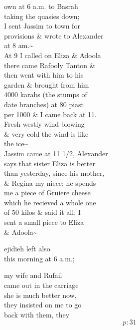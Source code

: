 \documentclass{report}
\begin{document}
	\par{
 	own at 6 a.m. to Basrah\ \\taking the quasies down;\ \\I sent Jassim to town for\ \\provisions \& wrote to Alexander\ \\at 8 am.\~{}\ \\At 9 I called on Eliza \& Adoola\ \\there came Rafooly Tanton \&\ \\then went with him to his\ \\garden \& brought from him\ \\4000 karabs (the stumps of\ \\date branches) at 80 piast\ \\per 1000 \& I came back at 11.\ \\Fresh westly wind blowing\ \\\& very cold the wind is like\ \\the ice\~{}\ \\Jassim came at 11 1/2, Alexander\ \\says that sister Eliza is better\ \\than yesterday, since his mother,\ \\\& Regina my niece; he spends\ \\me a piece of Gruiere cheese\ \\which he recieved a whole one\ \\of 50 kilos \& said it all; I\ \\sent a small piece to Eliza\ \\\& Adoola\~{}\ \\
	}

	\par{
 	ejidieh left also\ \\this morning at 6 a.m.;\ \\
	}

	\par{
 	my wife and Rufail\ \\came out in the carriage\ \\she is much better now,\ \\they insisted on me to go\ \\back with them, they\ \\
  \[p: 31 \]

	}



\end{document}
